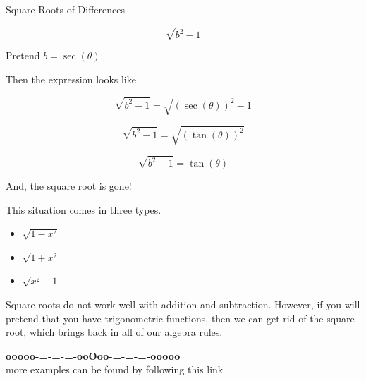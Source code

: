 \documentclass{ximera}
\begin{document}
\begin{example} Square Roots of Differences


\[
\sqrt{b^2 - 1} 
\]


Pretend $b = \sec(\theta)$. 

Then the expression looks like

\[
\sqrt{b^2 - 1} = \sqrt{(\sec(\theta))^2 - 1}
\]


\[
\sqrt{b^2 - 1} = \sqrt{(\tan(\theta))^2}
\]


\[
\sqrt{b^2  - 1} = \tan(\theta)
\]



And, the square root is gone! 




\end{example}






This situation comes in three types.



\begin{itemize}
\item $\sqrt{1 - x^2}$
\item $\sqrt{1 + x^2}$
\item $\sqrt{x^2 - 1}$
\end{itemize}


Square roots do not work well with addition and subtraction.  However, if you will pretend that you have trigonometric functions, then we can get rid of the square root, which brings back in all of our algebra rules.



























\begin{center}
\textbf{\textcolor{green!50!black}{ooooo-=-=-=-ooOoo-=-=-=-ooooo}} \\

more examples can be found by following this link\\ 

\end{center}
\end{document}

